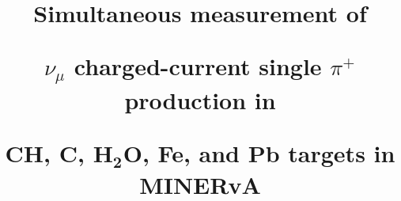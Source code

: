 \documentclass[aps,preprint,showpacs,superscriptaddress,letterpaper,showkeys,superscriptaddress,nofootinbib,floatfix]{revtex4-1}
\newcommand{\firstReviewAdd}[1]{{\bf\color{blue} \protect #1}}
\newcommand{\firstReviewStrike}[1]{{\bf\color{blue}\protect \sout{#1}}}
\renewcommand{\firstReviewAdd}[1]{\protect #1}
\renewcommand{\firstReviewStrike}[1]{}
\begin{document}







\title{Simultaneous measurement of 
\firstReviewStrike{muon neutrino}
\firstReviewAdd{$\nu_\mu$} charged-current 
\firstReviewAdd{ single} $\pi^+$ production in 
\firstReviewStrike{carbon, water, iron, lead, and plastic}
\firstReviewAdd{CH, C, $\mathbf{H_2O}$, Fe, and Pb} targets
\firstReviewAdd{in MINERvA}}
\newcommand{\bkgdtype}{_MENU1PI}

\end{document}

